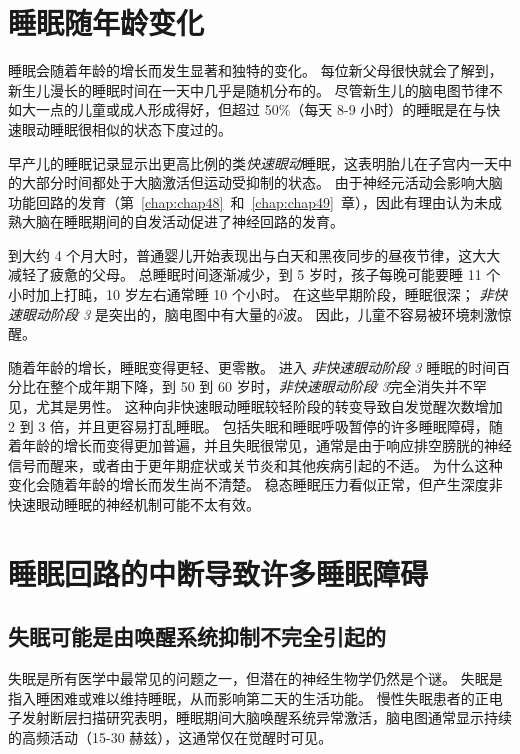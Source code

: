 \section{睡眠随年龄变化}

睡眠会随着年龄的增长而发生显著和独特的变化。
每位新父母很快就会了解到，新生儿漫长的睡眠时间在一天中几乎是随机分布的。
尽管新生儿的脑电图节律不如大一点的儿童或成人形成得好，但超过 50\%（每天 8-9 小时）的睡眠是在与快速眼动睡眠很相似的状态下度过的。


早产儿的睡眠记录显示出更高比例的类\textit{快速眼动}睡眠，这表明胎儿在子宫内一天中的大部分时间都处于大脑激活但运动受抑制的状态。
由于神经元活动会影响大脑功能回路的发育（第~\ref{chap:chap48}~和~\ref{chap:chap49}~章），因此有理由认为未成熟大脑在睡眠期间的自发活动促进了神经回路的发育。


到大约 4 个月大时，普通婴儿开始表现出与白天和黑夜同步的昼夜节律，这大大减轻了疲惫的父母。
总睡眠时间逐渐减少，到 5 岁时，孩子每晚可能要睡 11 个小时加上打盹，10 岁左右通常睡 10 个小时。
在这些早期阶段，睡眠很深；
\textit{非快速眼动阶段 3} 是突出的，脑电图中有大量的$ \delta $波。
因此，儿童不容易被环境刺激惊醒。


随着年龄的增长，睡眠变得更轻、更零散。
进入 \textit{非快速眼动阶段 3} 睡眠的时间百分比在整个成年期下降，到 50 到 60 岁时，\textit{非快速眼动阶段 3}完全消失并不罕见，尤其是男性。
这种向非快速眼动睡眠较轻阶段的转变导致自发觉醒次数增加 2 到 3 倍，并且更容易打乱睡眠。
包括失眠和睡眠呼吸暂停的许多睡眠障碍，随着年龄的增长而变得更加普遍，并且失眠很常见，通常是由于响应排空膀胱的神经信号而醒来，或者由于更年期症状或关节炎和其他疾病引起的不适。
为什么这种变化会随着年龄的增长而发生尚不清楚。
稳态睡眠压力看似正常，但产生深度非快速眼动睡眠的神经机制可能不太有效。


\section{睡眠回路的中断导致许多睡眠障碍}

\subsection{失眠可能是由唤醒系统抑制不完全引起的}


失眠是所有医学中最常见的问题之一，但潜在的神经生物学仍然是个谜。
失眠是指入睡困难或难以维持睡眠，从而影响第二天的生活功能。
慢性失眠患者的正电子发射断层扫描研究表明，睡眠期间大脑唤醒系统异常激活，脑电图通常显示持续的高频活动（15-30 赫兹），这通常仅在觉醒时可见。


